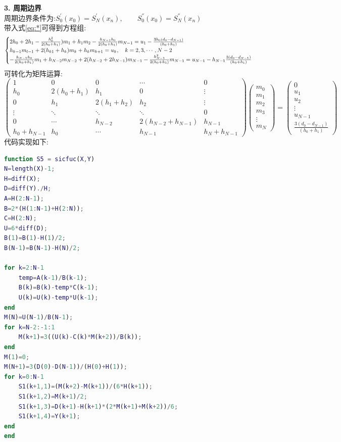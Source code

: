\documentclass[UTF8]{ctexart}
\begin{document}
\textbf{3. 周期边界}\\
周期边界条件为:$S_0^{'}(x_0)=S_N^{'}(x_n),\qquad S_0^{''}(x_0)=S_N^{''}(x_n)$\\
带入式\ref{eq:*}可得到方程组:
\begin{equation}
	\begin{cases}
		2h_0+2h_1-\frac{h_0^2}{2(h_0+h_1)})m_1+h_1m_2-\frac{h_{N-1}h_0}{2(h_0+h_1)}m_{N-1}=u_1-\frac{3h_0(d_0-d_{N-1})}{(h_0+h_1)} \\
		h_{k-1}m_{l-1}+2(h_{k1}+h_k)m_k+h_km_{k+1}=u_k,\quad k=2,3,\cdots,N-2 \\
		-\frac{h_{N-1}h_0}{2(h_0+h_1)}m_1+h_{N-2}m_{N-2}+2(h_{N-2}+2h_{N-1})m_{N-1}-\frac{h_{N-1}^2}{2(h_0+h_1)}m_{N-1}=u_{N-1}-h_{N-1}\frac{3(d_0-d_{N-1})}{(h_0+h_1)} \notag
	\end{cases}
\end{equation}
可转化为矩阵运算:
\begin{equation}
	\left(
	\begin{array}{ccccc}
		1 & 0 & 0 & \cdots & 0 \\
		h_0 & 2(h_0+h_1) & h_1 & 0 & \vdots\\
		0 & h_1 & 2(h_1+h_2) & h_2 & \vdots\\
		\vdots & \ddots & \ddots & \ddots & 0\\
		0 & \cdots & h_{N-2} & 2(h_{N-2}+h_{N-1}) & h_{N-1}\\
		h_0+h_{N-1} & h_0 & \cdots & h_{N-1} & h_{N}+h_{N-1} 
	\end{array}
	\right)
	\left(
	\begin{array}{c}
		m_0\\
		m_1\\
		m_2\\
		m_3\\
		\vdots \\
		m_{N}
	\end{array}
	\right)
	=
	\left(
	\begin{array}{c}
		0\\
		u_1\\
		u_2\\
		\vdots \\
		u_{N-1}\\
		\frac{3(d_0-d_{N-1})}{(h_0+h_1)}
	\end{array}
	\right)
\end{equation}
代码实现如下:
\begin{lstlisting}[language=matlab]
function S5 = sicfuc(X,Y)
N=length(X)-1;
H=diff(X);
D=diff(Y)./H;
A=H(2:N-1);
B=2*(H(1:N-1)+H(2:N));
C=H(2:N);
U=6*diff(D);
B(1)=B(1)-H(1)/2;
B(N-1)=B(N-1)-H(N)/2;

for k=2:N-1
	temp=A(k-1)/B(k-1);
	B(k)=B(k)-temp*C(k-1);
	U(k)=U(k)-temp*U(k-1);
end
M(N)=U(N-1)/B(N-1);
for k=N-2:-1:1
	M(k+1)=3((U(k)-C(k)*M(k+2))/B(k));
end
M(1)=0;
M(N+1)=3(D(0)-D(N-1))/(H(0)+H(1));
for k=0:N-1
	S1(k+1,1)=(M(k+2)-M(k+1))/(6*H(k+1));
	S1(k+1,2)=M(k+1)/2;
	S1(k+1,3)=D(k+1)-H(k+1)*(2*M(k+1)+M(k+2))/6;
	S1(k+1,4)=Y(k+1);
end
end
\end{lstlisting}
\end{document}
